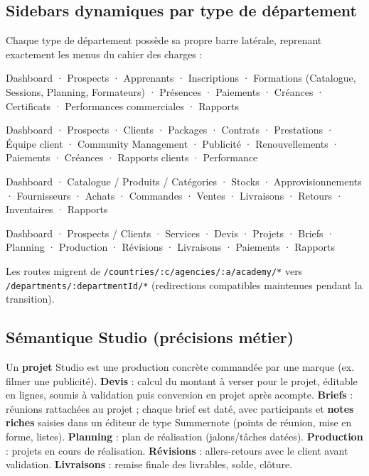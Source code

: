 \documentclass[11pt,a4paper]{article}
\begin{document}
\subsection{Sidebars dynamiques par type de département}

Chaque type de département possède sa propre barre latérale, reprenant exactement les menus du cahier des charges :

\begin{description}[leftmargin=2.2cm, style=nextline]
  \item[type academy] Dashboard · Prospects · Apprenants · Inscriptions · Formations (Catalogue, Sessions, Planning, Formateurs) · Présences · Paiements · Créances · Certificats · Performances commerciales · Rapports
  \item[type agency] Dashboard · Prospects · Clients · Packages · Contrats · Prestations · Équipe client · Community Management · Publicité · Renouvellements · Paiements · Créances · Rapports clients · Performance
  \item[type store] Dashboard · Catalogue / Produits / Catégories · Stocks · Approvisionnements · Fournisseurs · Achats · Commandes · Ventes · Livraisons · Retours · Inventaires · Rapports
  \item[type studio] Dashboard · Prospects / Clients · Services · Devis · Projets · Briefs · Planning · Production · Révisions · Livraisons · Paiements · Rapports
\end{description}

Les routes migrent de \texttt{/countries/:c/agencies/:a/academy/*} vers \texttt{/departments/:departmentId/*} (redirections compatibles maintenues pendant la transition).

\subsection{Sémantique Studio (précisions métier)}

Un \textbf{projet} Studio est une production concrète commandée par une marque (ex. filmer une publicité). \textbf{Devis} : calcul du montant à verser pour le projet, éditable en lignes, soumis à validation puis conversion en projet après acompte. \textbf{Briefs} : réunions rattachées au projet ; chaque brief est daté, avec participants et \textbf{notes riches} saisies dans un éditeur de type Summernote (points de réunion, mise en forme, listes). \textbf{Planning} : plan de réalisation (jalons/tâches datées). \textbf{Production} : projets en cours de réalisation. \textbf{Révisions} : allers-retours avec le client avant validation. \textbf{Livraisons} : remise finale des livrables, solde, clôture.
\end{document}
